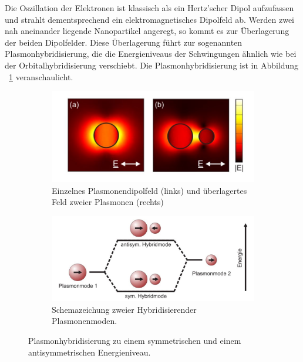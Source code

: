 Die Oszillation der Elektronen ist klassisch als ein Hertz'scher Dipol aufzufassen und strahlt dementsprechend ein elektromagnetisches Dipolfeld ab.
Werden zwei nah aneinander liegende Nanopartikel angeregt, so kommt es zur Überlagerung der beiden Dipolfelder. Diese Überlagerung führt zur sogenannten Plasmonhybridisierung, die die Energieniveaus der Schwingungen ähnlich wie bei der Orbitalhybridisierung verschiebt. Die Plasmonhybridisierung ist in Abbildung ~\ref{fig:hybrid} veranschaulicht. \cite{bayreuth}
\begin{figure}[H]
  \centering
  \begin{subfigure}{0.49\textwidth}
    \includegraphics[width=\textwidth]{plots/hybrid.jpg}
    \caption{Einzelnes Plasmonendipolfeld (links) und überlagertes Feld zweier Plasmonen (rechts)}
  \end{subfigure}
  \begin{subfigure}{0.49\textwidth}
    \includegraphics[width=\textwidth]{plots/hybridschema.jpg}
    \caption{Schemazeichung zweier Hybridisierender Plasmonenmoden.}
  \end{subfigure}
  \caption{Plasmonhybridisierung zu einem symmetrischen und einem antisymmetrischen Energieniveau. \cite{bayreuth}}
  \label{fig:hybrid}
\end{figure}

